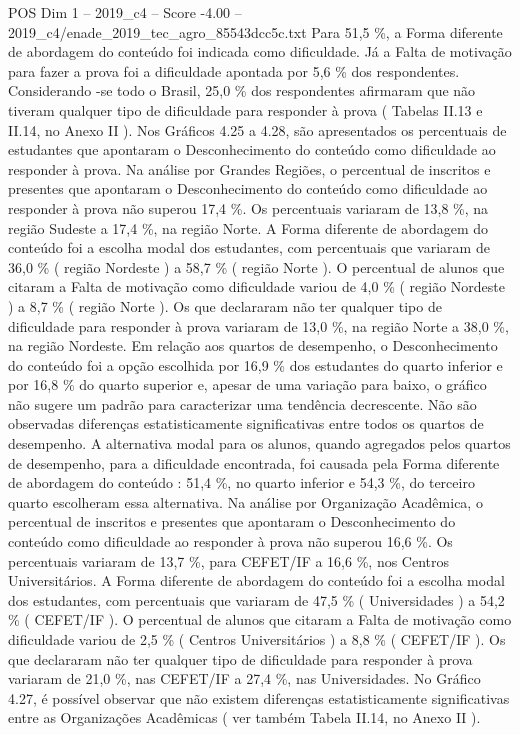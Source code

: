 \begin{textsample}{POS Dim 1 – 2019\_c4 – Score -4.00 – 2019\_c4/enade\_2019\_tec\_agro\_85543dcc5c.txt}
Para 51,5 \%, a Forma diferente de abordagem do conteúdo foi indicada como dificuldade.
Já a Falta de motivação para fazer a prova foi a dificuldade apontada por 5,6 \% dos respondentes.
Considerando -se todo o Brasil, 25,0 \% dos respondentes afirmaram que não tiveram qualquer tipo de dificuldade para responder à prova ( Tabelas II.13 e II.14, no Anexo II ).
Nos Gráficos 4.25 a 4.28, são apresentados os percentuais de estudantes que apontaram o Desconhecimento do conteúdo como dificuldade ao responder à prova.
Na análise por Grandes Regiões, o percentual de inscritos e presentes que apontaram o Desconhecimento do conteúdo como dificuldade ao responder à prova não superou 17,4 \%.
Os percentuais variaram de 13,8 \%, na região Sudeste a 17,4 \%, na região Norte.
A Forma diferente de abordagem do conteúdo foi a escolha modal dos estudantes, com percentuais que variaram de 36,0 \% ( região Nordeste ) a 58,7 \% ( região Norte ).
O percentual de alunos que citaram a Falta de motivação como dificuldade variou de 4,0 \% ( região Nordeste ) a 8,7 \% ( região Norte ).
Os que declararam não ter qualquer tipo de dificuldade para responder à prova variaram de 13,0 \%, na região Norte a 38,0 \%, na região Nordeste.
Em relação aos quartos de desempenho, o Desconhecimento do conteúdo foi a opção escolhida por 16,9 \% dos estudantes do quarto inferior e por 16,8 \% do quarto superior e, apesar de uma variação para baixo, o gráfico não sugere um padrão para caracterizar uma tendência decrescente.
Não são observadas diferenças estatisticamente significativas entre todos os quartos de desempenho.
A alternativa modal para os alunos, quando agregados pelos quartos de desempenho, para a dificuldade encontrada, foi causada pela Forma diferente de abordagem do conteúdo : 51,4 \%, no quarto inferior e 54,3 \%, do terceiro quarto escolheram essa alternativa.
Na análise por Organização Acadêmica, o percentual de inscritos e presentes que apontaram o Desconhecimento do conteúdo como dificuldade ao responder à prova não superou 16,6 \%.
Os percentuais variaram de 13,7 \%, para CEFET/IF a 16,6 \%, nos Centros Universitários.
A Forma diferente de abordagem do conteúdo foi a escolha modal dos estudantes, com percentuais que variaram de 47,5 \% ( Universidades ) a 54,2 \% ( CEFET/IF ).
O percentual de alunos que citaram a Falta de motivação como dificuldade variou de 2,5 \% ( Centros Universitários ) a 8,8 \% ( CEFET/IF ).
Os que declararam não ter qualquer tipo de dificuldade para responder à prova variaram de 21,0 \%, nas CEFET/IF a 27,4 \%, nas Universidades.
No Gráfico 4.27, é possível observar que não existem diferenças estatisticamente significativas entre as Organizações Acadêmicas ( ver também Tabela II.14, no Anexo II ).

\end{textsample}
